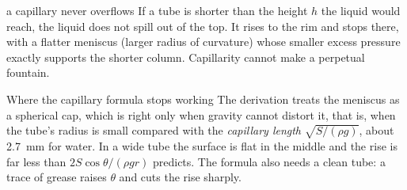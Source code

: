 \begin{trapbox}{a capillary never overflows}
If a tube is shorter than the height $h$ the liquid would reach, the liquid does not spill out of the top.
It rises to the rim and stops there, with a flatter meniscus (larger radius of curvature) whose smaller
excess pressure exactly supports the shorter column. Capillarity cannot make a perpetual fountain.
\end{trapbox}

\begin{remarkbox}{Where the capillary formula stops working}
The derivation treats the meniscus as a spherical cap, which is right only when gravity cannot distort it,
that is, when the tube's radius is small compared with the \emph{capillary length}
$\sqrt{S/(\rho g)}$, about \SI{2.7}{mm} for water. In a wide tube the surface is flat in the middle and the
rise is far less than $2S\cos\theta/(\rho gr)$ predicts. The formula also needs a clean tube: a trace of
grease raises $\theta$ and cuts the rise sharply.
\end{remarkbox}


